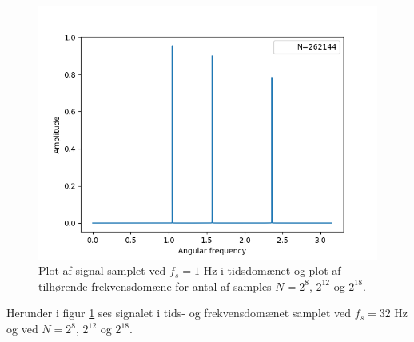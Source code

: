 \begin{figure}
\begin{minipage}{0.49\textwidth}
\includegraphics[width=\textwidth]{figures/frekvensanalyse/1hz_freq3.png}
\end{minipage}
\caption{Plot af signal samplet ved $f_s=1$ Hz i tidsdomænet og plot af tilhørende frekvensdomæne for antal af samples $N=2^8$, $2^{12}$ og $2^{18}$.}
\label{fig:1}
\end{figure}
Herunder i figur \ref{fig:1} ses signalet i tids- og frekvensdomænet samplet ved $f_s=32$ Hz og ved $N=2^8$, $2^{12}$ og $2^{18}$.
